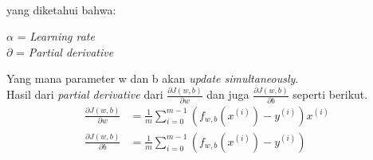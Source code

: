 \label{eq:2.gradient}
\\
yang diketahui bahwa:
\begin{center}
    $\alpha$ = \textit{Learning rate}\\
    $\partial$ = \textit{Partial derivative}
\end{center}
Yang mana parameter w dan b akan \textit{update simultaneously}.\\
Hasil dari \textit{partial derivative} dari $\frac{\partial J(w,b)}{\partial w}$ dan juga $\frac{\partial J(w,b)}{\partial b}$ seperti berikut. \\
\begin{equation}
    \begin{aligned}
    \frac{\partial J(w,b)}{\partial w} &= \frac{1}{m} \sum_{i=0}^{m-1} \left( f_{w,b}\left(x^{(i)}\right) - y^{(i)} \right) x^{(i)} \\
    \frac{\partial J(w,b)}{\partial b} &= \frac{1}{m} \sum_{i=0}^{m-1} \left( f_{w,b}\left(x^{(i)}\right) - y^{(i)} \right)
    \end{aligned}
\end{equation}
\label{eq:2.partialgradient}

